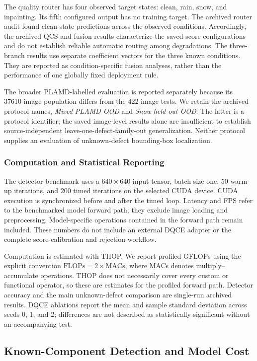 The quality router has four observed target states: clean, rain, snow, and
inpainting. Its fifth configured output has no training target. The archived
router audit found clean-state predictions across the observed conditions.
Accordingly, the archived QCS and fusion results characterize the saved
score configurations and do not establish reliable automatic routing among
degradations. The three-branch results use separate coefficient vectors for
the three known conditions. They are reported as condition-specific fusion
analyses, rather than the performance of one globally fixed deployment rule.

The broader PLAMD-labelled evaluation is reported separately because its
37610-image population differs from the 422-image tests. We retain the
archived protocol names, \emph{Mixed PLAMD OOD} and \emph{Snow-held-out OOD}.
The latter is a protocol identifier; the saved image-level results alone
are insufficient to establish source-independent leave-one-defect-family-out
generalization. Neither protocol supplies an evaluation of unknown-defect
bounding-box localization.

\subsubsection{Computation and Statistical Reporting}
The detector benchmark uses a $640\times640$ input tensor, batch size one,
50 warm-up iterations, and 200 timed iterations on the selected CUDA device.
CUDA execution is synchronized before and after the timed loop. Latency and
FPS refer to the benchmarked model forward path; they exclude image loading
and preprocessing. Model-specific operations contained in the forward path
remain included. These numbers do not include an external DQCE adapter or
the complete score-calibration and rejection workflow.

Computation is estimated with THOP. We report profiled GFLOPs using the
explicit convention $\mathrm{FLOPs}=2\times\mathrm{MACs}$, where MACs denotes
multiply--accumulate operations. THOP does not necessarily
cover every custom or functional operator, so these are estimates for the
profiled forward path. Detector accuracy and the main unknown-defect
comparison are single-run archived results. DQCE ablations report the mean
and sample standard deviation across seeds 0, 1, and 2; differences are not
described as statistically significant without an accompanying test.

\subsection{Known-Component Detection and Model Cost}
\label{subsec:detection_results}

